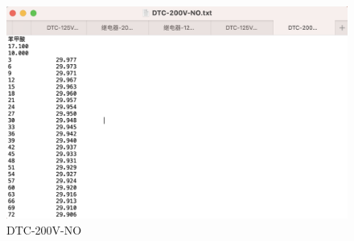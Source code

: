 \documentclass[12pt]{ctexart}
\numberwithin{equation}{section}
\begin{document}
\begin{figure}[ht]
    \centering
    \includegraphics[width=1\textwidth]{8.png}
    \caption{DTC-200V-NO}
\end{figure}
\end{document}
